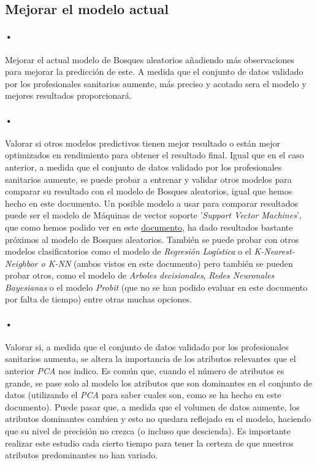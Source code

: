 \subsection{Mejorar el modelo actual}
\paragraph{•} Mejorar el actual modelo de Bosques aleatorios añadiendo más observaciones para mejorar la predicción de este. A medida que el conjunto de datos validado por los profesionales sanitarios aumente, más preciso y acotado sera el modelo y mejores resultados proporcionará.

\paragraph{•} Valorar si otros modelos predictivos tienen mejor resultado o están mejor optimizados en rendimiento para obtener el resultado final. Igual que en el caso anterior, a medida que el conjunto de datos validado por los profesionales sanitarios aumente, se puede probar a entrenar y validar otros modelos para comparar su resultado con el modelo de Bosques aleatorios, igual que hemos hecho en este documento. Un posible modelo a usar para comparar resultados puede ser el modelo de Máquinas de vector soporte '\textit{Support Vector Machines}', que como hemos podido ver en este \hyperref[resultados:svm]{documento}, ha dado resultados bastante próximos al modelo de Bosques aleatorios. También se puede probar con otros modelos clasificatorios como el modelo de \textit{Regresión Logística} o el \textit{K-Nearest-Neighbor o K-NN} (ambos vistos en este documento) pero también se pueden probar otros, como el modelo de \textit{Arboles decisionales}, \textit{Redes Neuronales Bayesianas} o el modelo \textit{Probit} (que no se han podido evaluar en este documento por falta de tiempo) entre otras muchas opciones.

\paragraph{•} Valorar si, a medida que el conjunto de datos validado por los profesionales sanitarios aumenta, se altera la importancia de los atributos relevantes que el anterior \textit{PCA} nos indico. Es común que, cuando el número de atributos es grande, se pase solo al modelo los atributos que son dominantes en el conjunto de datos (utilizando el \textit{PCA} para saber cuales son, como se ha hecho en este documento). Puede pasar que, a medida que el volumen de datos aumente, los atributos dominantes cambien y esto no quedara reflejado en el modelo, haciendo que su nivel de precisión no crezca (o incluso que descienda). Es importante realizar este estudio cada cierto tiempo para tener la certeza de que nuestros atributos predominantes no han variado.

